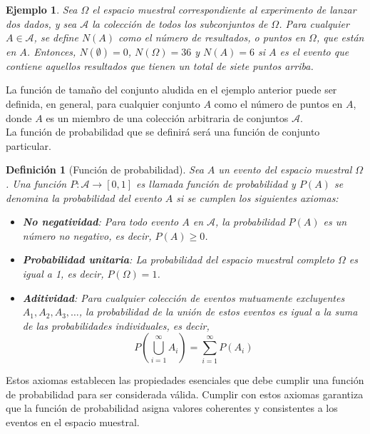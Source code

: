 \documentclass[12pt]{article}
\newtheorem*{example}{Ejemplo}
\newtheorem{definition}{Definición}
\begin{document}
\begin{example}
    Sea $\Omega$ el espacio muestral correspondiente al experimento de lanzar dos dados, y sea $\mathscr A$ la colección de todos los subconjuntos de $\Omega$. Para cualquier $A\in\mathscr A$, se define $N(A)$ como el número de resultados, o puntos en $\Omega$, que están en $A$. Entonces, $N(\emptyset)=0$, $N(\Omega)=36$ y $N(A)=6$ si $A$ es el evento que contiene aquellos resultados que tienen un total de siete puntos arriba.
\end{example}
La función de tamaño del conjunto aludida en el ejemplo anterior puede ser definida, en general, para cualquier conjunto $A$ como el número de puntos en $A$, donde $A$ es un miembro de una colección arbitraria de conjuntos $\mathscr A$.\\

La función de probabilidad que se definirá será una función de conjunto particular.
\begin{definition}[Función de probabilidad]
   Sea $A$ un evento del espacio muestral $\Omega$. Una función $P: \mathscr A \to [0,1]$ es llamada función de probabilidad y $P(A)$ se denomina la \textit{probabilidad} del evento $A$ si se cumplen los siguientes axiomas:
\begin{itemize}
    \item[(i)] \textbf{No negatividad}: Para todo evento $A$ en $\mathscr{A}$, la probabilidad $P(A)$ es un número no negativo, es decir, $P(A) \geq 0$.
    \item[(ii)] \textbf{Probabilidad unitaria}: La probabilidad del espacio muestral completo $\Omega$ es igual a 1, es decir, $P(\Omega) = 1$.
    \item[(iii)] \textbf{Aditividad}: Para cualquier colección de eventos mutuamente excluyentes $A_1, A_2, A_3, \ldots$, la probabilidad de la unión de estos eventos es igual a la suma de las probabilidades individuales, es decir, $$P\left(\bigcup_{i=1}^\infty A_i\right) = \sum_{i=1}^\infty P(A_i)$$
\end{itemize} 
\end{definition}
Estos axiomas establecen las propiedades esenciales que debe cumplir una función de probabilidad para ser considerada válida. Cumplir con estos axiomas garantiza que la función de probabilidad asigna valores coherentes y consistentes a los eventos en el espacio muestral.\\
\end{document}
